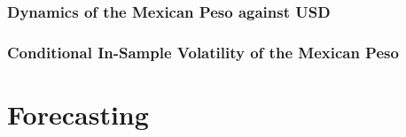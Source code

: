 \documentclass{beamer}
\begin{document}
\begin{frame}
\frametitle{Dynamics of the Mexican Peso against USD}
\end{frame}

\begin{frame}
\frametitle{Conditional In-Sample Volatility of the Mexican Peso}
\end{frame}

\section{Forecasting}
\end{document}
